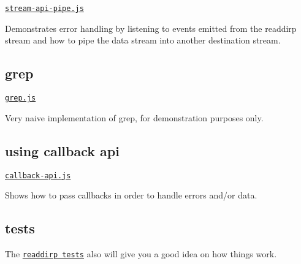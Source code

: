 \href{https://github.com/thlorenz/readdirp/blob/master/examples/stream-api-pipe.js}{\tt stream-\/api-\/pipe.\+js}

Demonstrates error handling by listening to events emitted from the readdirp stream and how to pipe the data stream into another destination stream.

\subsection*{grep}

\href{https://github.com/thlorenz/readdirp/blob/master/examples/grep.js}{\tt grep.\+js}

Very naive implementation of grep, for demonstration purposes only.

\subsection*{using callback api}

\href{https://github.com/thlorenz/readdirp/blob/master/examples/callback-api.js}{\tt callback-\/api.\+js}

Shows how to pass callbacks in order to handle errors and/or data.

\subsection*{tests}

The \href{https://github.com/thlorenz/readdirp/blob/master/test/readdirp.js}{\tt readdirp tests} also will give you a good idea on how things work. 